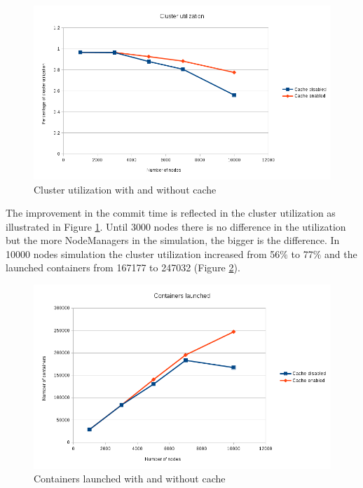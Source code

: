 \begin{figure}
\centering
\includegraphics[scale=0.6]{resources/images/Evaluation/dto_cache_cluster_util.png}
\caption{Cluster utilization with and without cache}
\label{fig:ev_cache_cluster_util}
\end{figure}

The improvement in the commit time is reflected in the cluster
utilization as illustrated in Figure \ref{fig:ev_cache_cluster_util}.
Until 3000 nodes there is no difference in the utilization but the more
NodeManagers in the simulation, the bigger is the difference. In 10000
nodes simulation the cluster utilization increased from 56$\%$ to
77$\%$ and the launched containers from 167177 to 247032 (Figure
\ref{fig:ev_cache_containers}).

\begin{figure}
\centering
\includegraphics[scale=0.6]{resources/images/Evaluation/dto_cache_containers.png}
\caption{Containers launched with and without cache}
\label{fig:ev_cache_containers}
\end{figure}

